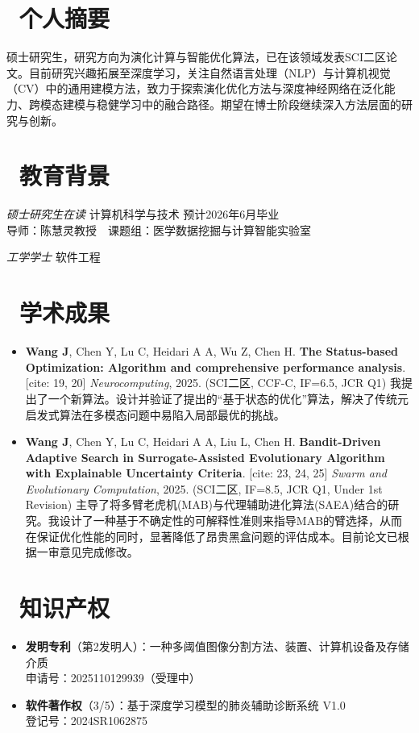 \documentclass{resume}
\begin{document}
\vspace{0.4cm} 

\section{\faInfoCircle\ 个人摘要}
硕士研究生，研究方向为演化计算与智能优化算法，已在该领域发表SCI二区论文。目前研究兴趣拓展至深度学习，关注自然语言处理（NLP）与计算机视觉（CV）中的通用建模方法，致力于探索演化优化方法与深度神经网络在泛化能力、跨模态建模与稳健学习中的融合路径。期望在博士阶段继续深入方法层面的研究与创新。

\section{\faGraduationCap\ 教育背景}
\textit{硕士研究生在读} \quad 计算机科学与技术 \quad 预计2026年6月毕业\\
导师：陈慧灵教授 课题组：医学数据挖掘与计算智能实验室

\textit{工学学士} \quad 软件工程

\section{\faFileTextO\ 学术成果}
\begin{itemize}
  \item \textbf{Wang J}, Chen Y, Lu C, Heidari A A, Wu Z, Chen H.
  \textbf{The Status-based Optimization: Algorithm and comprehensive performance analysis}. [cite: 19, 20]
  \textit{Neurocomputing}, 2025. (SCI二区, CCF-C, IF=6.5, JCR Q1)
  我提出了一个新算法。设计并验证了提出的“基于状态的优化”算法，解决了传统元启发式算法在多模态问题中易陷入局部最优的挑战。
  \item \textbf{Wang J}, Chen Y, Lu C, Heidari A A, Liu L, Chen H.
  \textbf{Bandit-Driven Adaptive Search in Surrogate-Assisted Evolutionary Algorithm with Explainable Uncertainty Criteria}. [cite: 23, 24, 25]
  \textit{Swarm and Evolutionary Computation}, 2025. (SCI二区, IF=8.5, JCR Q1, Under 1st Revision)
  主导了将多臂老虎机(MAB)与代理辅助进化算法(SAEA)结合的研究。我设计了一种基于不确定性的可解释性准则来指导MAB的臂选择，从而在保证优化性能的同时，显著降低了昂贵黑盒问题的评估成本。目前论文已根据一审意见完成修改。
\end{itemize}

\section{\faKey\ 知识产权}
\begin{itemize}
  \item \textbf{发明专利}（第2发明人）：一种多阈值图像分割方法、装置、计算机设备及存储介质\\
  申请号：2025110129939（受理中）
  \item \textbf{软件著作权}（3/5）：基于深度学习模型的肺炎辅助诊断系统 V1.0\\
  登记号：2024SR1062875
\end{itemize}
\end{document}
